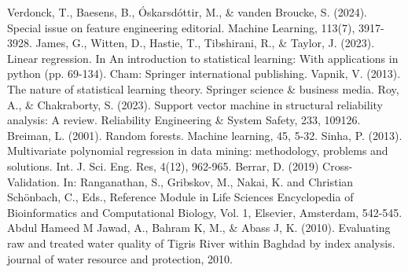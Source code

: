 \documentclass[12pt,a4paper]{article}
\begin{document}
\begin{enumerate}
\begin{thebibliography}{99}
 Verdonck, T., Baesens, B., Óskarsdóttir, M., \& vanden Broucke, S. (2024). Special issue on feature engineering editorial. Machine Learning, 113(7), 3917-3928.
 James, G., Witten, D., Hastie, T., Tibshirani, R., \& Taylor, J. (2023). Linear regression. In An introduction to statistical learning: With applications in python (pp. 69-134). Cham: Springer international publishing.
 Vapnik, V. (2013). The nature of statistical learning theory. Springer science \& business media.
 Roy, A., \& Chakraborty, S. (2023). Support vector machine in structural reliability analysis: A review. Reliability Engineering \& System Safety, 233, 109126.
 Breiman, L. (2001). Random forests. Machine learning, 45, 5-32.
 Sinha, P. (2013). Multivariate polynomial regression in data mining: methodology, problems and solutions. Int. J. Sci. Eng. Res, 4(12), 962-965.
 Berrar, D. (2019) Cross-Validation. In: Ranganathan, S., Gribskov, M., Nakai, K. and Christian Schönbach, C., Eds., Reference Module in Life Sciences Encyclopedia of Bioinformatics and Computational Biology, Vol. 1, Elsevier, Amsterdam, 542-545.
 Abdul Hameed M Jawad, A., Bahram K, M., \& Abass J, K. (2010). Evaluating raw and treated water quality of Tigris River within Baghdad by index analysis. journal of water resource and protection, 2010.
\end{thebibliography}

\end{enumerate}

\label{LastPage}
\end{document}
